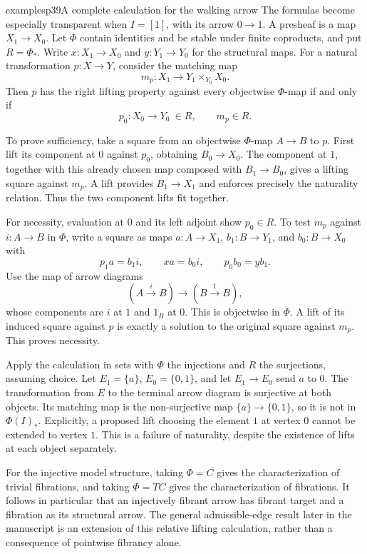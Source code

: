 \begin{dcomment}{examples}{p39}{A complete calculation for the walking arrow}
The formulas become especially transparent when $I=[1]$, with its arrow $0\to1$. A presheaf is a map $X_1\to X_0$. Let $\Phi$ contain identities and be stable under finite coproducts, and put $R=\Phi_*$. Write $x:X_1\to X_0$ and $y:Y_1\to Y_0$ for the structural maps. For a natural transformation $p:X\to Y$, consider the matching map
\[
 m_p:X_1\longrightarrow Y_1\times_{Y_0}X_0.
\]
Then $p$ has the right lifting property against every objectwise $\Phi$-map if and only if
\[
 p_0:X_0\to Y_0\ \in R,
 \qquad m_p\in R.
\]

To prove sufficiency, take a square from an objectwise $\Phi$-map $A\to B$ to $p$. First lift its component at $0$ against $p_0$, obtaining $B_0\to X_0$. The component at $1$, together with this already chosen map composed with $B_1\to B_0$, gives a lifting square against $m_p$. A lift provides $B_1\to X_1$ and enforces precisely the naturality relation. Thus the two component lifts fit together.

For necessity, evaluation at $0$ and its left adjoint show $p_0\in R$. To test $m_p$ against $i:A\to B$ in $\Phi$, write a square as maps $a:A\to X_1$, $b_1:B\to Y_1$, and $b_0:B\to X_0$ with
\[
 p_1a=b_1i,\qquad xa=b_0i,\qquad p_0b_0=yb_1.
\]
Use the map of arrow diagrams
\[
 (A\xrightarrow{i}B)\longrightarrow(B\xrightarrow{1}B),
\]
whose components are $i$ at $1$ and $1_B$ at $0$. This is objectwise in $\Phi$. A lift of its induced square against $p$ is exactly a solution to the original square against $m_p$. This proves necessity.

Apply the calculation in sets with $\Phi$ the injections and $R$ the surjections, assuming choice. Let $E_1=\{a\}$, $E_0=\{0,1\}$, and let $E_1\to E_0$ send $a$ to $0$. The transformation from $E$ to the terminal arrow diagram is surjective at both objects. Its matching map is the non-surjective map $\{a\}\to\{0,1\}$, so it is not in $\Phi(I)_*$. Explicitly, a proposed lift choosing the element $1$ at vertex $0$ cannot be extended to vertex $1$. This is a failure of naturality, despite the existence of lifts at each object separately.

For the injective model structure, taking $\Phi=C$ gives the characterization of trivial fibrations, and taking $\Phi=TC$ gives the characterization of fibrations. It follows in particular that an injectively fibrant arrow has fibrant target and a fibration as its structural arrow. The general admissible-edge result later in the manuscript is an extension of this relative lifting calculation, rather than a consequence of pointwise fibrancy alone.
\end{dcomment}

